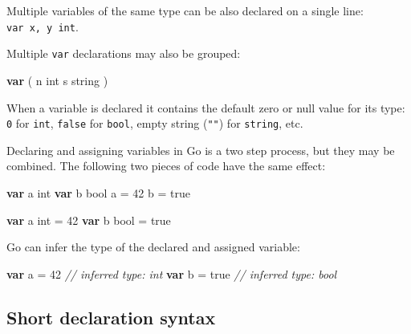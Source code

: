 \documentclass[]{book}
\newenvironment{Shaded}{\begin{snugshade}}{\end{snugshade}}
\newcommand{\CommentTok}[1]{\textcolor[rgb]{0.56,0.35,0.01}{\textit{#1}}}
\newcommand{\DataTypeTok}[1]{\textcolor[rgb]{0.13,0.29,0.53}{#1}}
\newcommand{\DecValTok}[1]{\textcolor[rgb]{0.00,0.00,0.81}{#1}}
\newcommand{\KeywordTok}[1]{\textcolor[rgb]{0.13,0.29,0.53}{\textbf{#1}}}
\newcommand{\NormalTok}[1]{#1}
\newcommand{\OtherTok}[1]{\textcolor[rgb]{0.56,0.35,0.01}{#1}}
\let\BeginKnitrBlock\begin \let\EndKnitrBlock\end
\begin{document}
\BeginKnitrBlock{rmdnote}
Multiple variables of the same type can be also declared on a single line:
\texttt{var\ x,\ y\ int}.
\EndKnitrBlock{rmdnote}

Multiple \texttt{var} declarations may also be grouped:

\begin{Shaded}
\begin{Highlighting}[]
\KeywordTok{var}\NormalTok{ (}
\NormalTok{    n }\DataTypeTok{int}
\NormalTok{    s }\DataTypeTok{string}
\NormalTok{)}
\end{Highlighting}
\end{Shaded}

When a variable is declared it contains the default zero or null value for its
type: \texttt{0} for \texttt{int}, \texttt{false} for \texttt{bool}, empty string (\texttt{""}) for \texttt{string}, etc.

Declaring and assigning variables in Go is a two step process, but they may be
combined. The following two pieces of code have the same effect:

\begin{Shaded}
\begin{Highlighting}[]
\KeywordTok{var}\NormalTok{ a }\DataTypeTok{int}
\KeywordTok{var}\NormalTok{ b }\DataTypeTok{bool}
\NormalTok{a = }\DecValTok{42}
\NormalTok{b = }\OtherTok{true}
\end{Highlighting}
\end{Shaded}

\begin{Shaded}
\begin{Highlighting}[]
\KeywordTok{var}\NormalTok{ a }\DataTypeTok{int}\NormalTok{ = }\DecValTok{42}
\KeywordTok{var}\NormalTok{ b }\DataTypeTok{bool}\NormalTok{ = }\OtherTok{true}
\end{Highlighting}
\end{Shaded}

Go can infer the type of the declared and assigned variable:

\begin{Shaded}
\begin{Highlighting}[]
\KeywordTok{var}\NormalTok{ a = }\DecValTok{42}   \CommentTok{// inferred type: int}
\KeywordTok{var}\NormalTok{ b = }\OtherTok{true} \CommentTok{// inferred type: bool}
\end{Highlighting}
\end{Shaded}

\hypertarget{short-declaration-syntax}{%
\subsection{Short declaration syntax}\label{short-declaration-syntax}}
\end{document}
